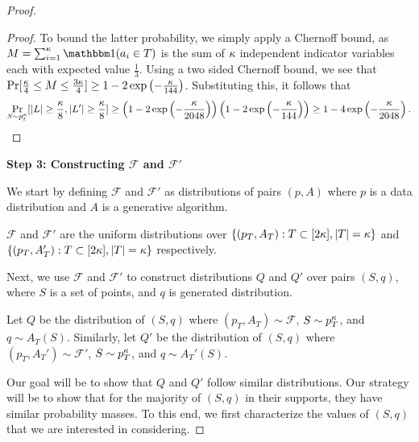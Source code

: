 \begin{proof}
\begin{proof}
To bound the latter probability, we simply apply a Chernoff bound, as $M = \sum_{i=1}^\a \ind(a_i \in T)$ is the sum of $\kappa$ independent indicator variables each with expected value $\frac{1}{3}$. Using a two sided Chernoff bound, we see that $\Pr[\frac{\kappa}{4} \leq M \leq \frac{3\kappa}{4}] \geq 1 - 2\exp \left( -\frac{\kappa}{144}\right)$. Substituting this, it follows that $$\Pr_{S \sim p_t^\kappa}[|L| \geq \frac{\kappa}{8}, |L'| \geq \frac{\kappa}{8}] \geq \left(1 - 2\exp\left(-\frac{\kappa}{2048}\right)\right)\left(1 - 2\exp \left( -\frac{\kappa}{144}\right) \right) \geq 1 - 4\exp\left(-\frac{\kappa}{2048}\right).$$
\end{proof}


\textbf{Step 3: Constructing $\mathcal{F}$ and $\mathcal{F'}$}

We start by defining $\mathcal{F}$ and $\mathcal{F'}$ as distributions of pairs $(p, A)$ where $p$ is a data distribution and $A$ is a generative algorithm. 

\begin{definition}\label{defn:f}
$\mathcal{F}$ and $\mathcal{F'}$ are the uniform distributions over $\{(p_T, A_T): T \subset [2\kappa], |T| = \kappa\}$ and $\{(p_T, A_T'): T \subset [2\kappa], |T| = \kappa\}$ respectively. 
\end{definition}

Next, we use $\mathcal{F}$ and $\mathcal{F'}$ to construct distributions $Q$ and $Q'$ over pairs $(S, q)$, where $S$ is a set of points, and $q$ is generated distribution. 

\begin{definition}\label{defn:q}
Let $Q$ be the distribution of $(S, q)$ where $(p_T, A_T) \sim \mathcal{F}$, $S \sim p_T^\kappa$, and $q \sim A_T(S)$. Similarly, let $Q'$ be the distribution of $(S, q)$ where $(p_T, A_T') \sim \mathcal{F'}$, $S \sim p_T^\kappa$, and $q \sim A_T'(S)$. 
\end{definition}

Our goal will be to show that $Q$ and $Q'$ follow similar distributions. Our strategy will be to show that for the majority of $(S, q)$ in their supports, they have similar probability masses. To this end, we first characterize the values of $(S, q)$ that we are interested in considering. 


\end{proof}
